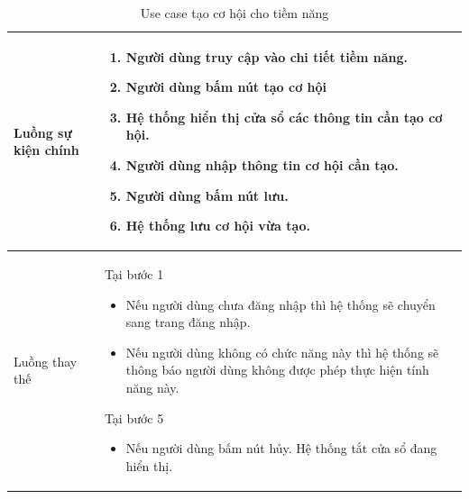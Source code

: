 \documentclass[12pt,a4paper]{article}
\begin{document}
\begin{table}[H]
\begin{tabular}{|p{3.5cm}|p{11.5cm}|c|}
            Luồng sự kiện chính & \vspace{-.8cm}\begin{enumerate}
                                                    \item Người dùng truy cập vào chi tiết tiềm năng.
                                                    \item Người dùng bấm nút tạo cơ hội
                                                    \item Hệ thống hiển thị cửa sổ các thông tin cần tạo cơ hội.
                                                    \item Người dùng nhập thông tin cơ hội cần tạo.
                                                    \item Người dùng bấm nút lưu.
                                                    \item Hệ thống lưu cơ hội vừa tạo.
            \end{enumerate}
            \\
            \hline
            Luồng thay thế & Tại bước 1\newline
            \vspace{-.8cm}\begin{itemize}
                              \item Nếu người dùng chưa đăng nhập thì hệ thống sẽ chuyển sang trang đăng nhập.
                              \item Nếu người dùng không có chức năng này thì hệ thống sẽ thông báo người dùng không được phép thực hiện tính năng này.
            \end{itemize}
            Tại bước 5\newline
            \vspace{-.8cm}\begin{itemize}
                              \item Nếu người dùng bấm nút hủy. Hệ thống tắt cửa sổ đang hiển thị.
            \end{itemize}
            \\ \hline
        \end{tabular}
        \caption{Use case tạo cơ hội cho tiềm năng}
    \end{table}


\end{document}
